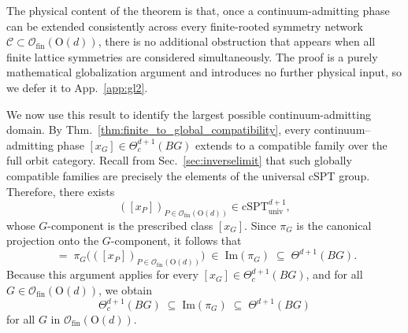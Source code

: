 \documentclass[aps,prx,reprint,superscriptaddress,twocolumn,amsmath,amssymb,amsfonts, nofootinbib]{revtex4-2}
\newcommand{\ofin}{\mathcal{O}_{\text{fin}}}
\theoremstyle{apsstyle}
\begin{document}
\medskip 

\noindent The physical content of the theorem is that, once a continuum-admitting phase can be extended consistently across every finite-rooted symmetry network $\mathcal{C} \subset \ofin(\mathrm{O}(d))$, there is no additional obstruction that appears when all finite lattice symmetries are considered simultaneously. The proof is a purely mathematical globalization argument and introduces no further physical input, so we defer it to App.~\ref{app:gl2}.

\bigskip 

We now use this result to identify the largest possible continuum-admitting domain. By Thm.~\ref{thm:finite_to_global_compatibility}, every continuum–admitting phase $[x_{G}]\in\Theta^{d+1}_{c}(BG)$ extends to a compatible family over the full orbit category. Recall from Sec.~\ref{sec:inverselimit} that such globally compatible families are precisely the elements of the universal cSPT group. Therefore, there exists
\begin{equation*}
    \left([x_{P}]\right)_{P\in\ofin(\mathrm{O}(d))}\in \mathrm{cSPT}^{d+1}_{\mathrm{univ}},
\end{equation*}
whose $G$-component is the prescribed class $[x_G]$. Since $\pi_G$ is the canonical projection onto the $G$-component, it follows that
\begin{equation}
    [x_G]\;=\;\pi_G\bigl(([x_P])_{P\in\ofin(\mathrm{O}(d))}\bigr)
    \;\in\;
    \mathrm{Im}(\pi_G) \;\subseteq\; \Theta^{d+1}(BG).
    \label{eq:Theta-c-contained-in-im-piH}
\end{equation}
Because this argument applies for every $[x_G]\in \Theta^{d+1}_c(BG)$, and for all $G\in \ofin(\mathrm{O}(d))$, we obtain
\begin{equation}
    \Theta^{d+1}_c(BG) \;\subseteq\;
    \mathrm{Im}(\pi_G) \;\subseteq\; \Theta^{d+1}(BG)
    \label{eq:Theta-c-subfunctor-of-im-pi}
\end{equation}
for all $G$ in $\ofin(\mathrm{O}(d))$. 

\bigskip 
\end{document}
